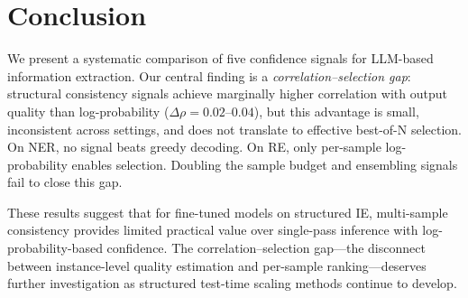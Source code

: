 \documentclass[11pt,a4paper]{article}
\begin{document}
\section{Conclusion}
\label{sec:conclusion}

We present a systematic comparison of five confidence signals for LLM-based information extraction. Our central finding is a \emph{correlation--selection gap}: structural consistency signals achieve marginally higher correlation with output quality than log-probability ($\Delta\rho = 0.02$--$0.04$), but this advantage is small, inconsistent across settings, and does not translate to effective best-of-N selection. On NER, no signal beats greedy decoding. On RE, only per-sample log-probability enables selection. Doubling the sample budget and ensembling signals fail to close this gap.

These results suggest that for fine-tuned models on structured IE, multi-sample consistency provides limited practical value over single-pass inference with log-probability-based confidence. The correlation--selection gap---the disconnect between instance-level quality estimation and per-sample ranking---deserves further investigation as structured test-time scaling methods continue to develop.

%
%
\end{document}
